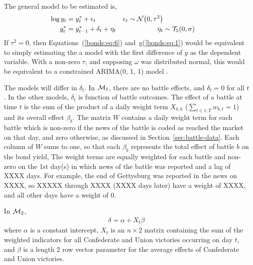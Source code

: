 The general model to be estimated is,
\begin{align}
  \label{bonds:eq:6}
  \log y_{t} &= y^{*}_{t} + \epsilon_{t} & \epsilon_{t} \sim \mathcal{N}\mathopen{}\left(0, \tau^{2}\right)\mathclose{} \\
  \label{bonds:eq:1}
  y^{*}_{t} &= y^{*}_{t - 1} + \delta_{t} + \eta_{t} & \eta_{t} &\sim \mathcal{T}_{5}\mathopen{}\left(0, \sigma\right)\mathclose{}
\end{align}
If $\tau^{2} = 0$, then Equations~(\ref{bonds:eq:6}) and~g(\ref{bonds:eq:1}) would be equivalent to simply estimating the a model with the first difference of $y$ as the dependent variable.
With a non-zero $\tau$, and supposing $\omega$ was distributed normal, this would be equivalent to a constrained ARIMA(0, 1, 1) model \parencite[91]{PetrisPetroneEtAl2009}.

The models will differ in $\delta_{t}$.
In $\mathcal{M}_{\text{1}}$, there are no battle effects, and $\delta_{t} = 0$ for all $t$.
In the other models, $\delta_{t}$ is function of battle outcomes.
The effect of a battle at time $t$ is the sum of the product of a daily weight term $X_{b,k}$ ($\sum_{t \in 1:T} w_{b,t} = 1$) and its overall effect $\beta_{b}$.
The matrix $W$ contains a daily weight term for each battle which is non-zero if the news of the battle is coded as reached the market on that day, and zero otherwise, as discussed in Section~\ref{sec:battle-data}.
Each column of $W$ sums to one, so that each $\beta_{b}$ represents the total effect of battle $b$ on the bond yield,
The weight terms are equally weighted for each battle and non-zero on the 1st day(s) in which news of the battle was reported and a lag of XXXX days.
For example, the end of Gettysburg was reported in the news on XXXX, so XXXXX through XXXX (XXXX days later) have a weight of XXXX, and all other days have a weight of 0.

In $\mathcal{M}_{\text{2}}$,
\begin{align}
  \label{bonds:eq:2}
  \delta = \alpha + X_{t} \beta
\end{align}
where $\alpha$ is a constant intercept, $X_{t}$ is an $n \times 2$ matrix containing the sum of the weighted indicators for all Confederate and Union victories occurring on day $t$,
and $\beta$ is a length 2 row vector parameter for the average effects of Confederate and Union victories.

